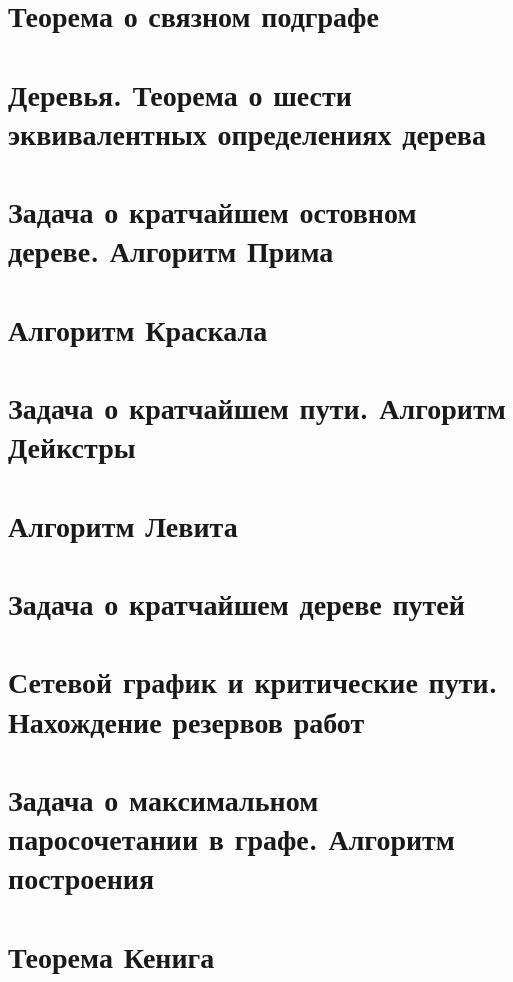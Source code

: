 \documentclass[12pt, fleqn]{article}
\begin{document}
  \section{Теорема о связном подграфе}

  
  \newpage

  \section{Деревья. Теорема о шести эквивалентных определениях дерева}
  
  \newpage

  \section{Задача о кратчайшем остовном дереве. Алгоритм Прима}
  \newpage

  \section{Алгоритм Краскала}
  \newpage

  \section{Задача о кратчайшем пути. Алгоритм Дейкстры}
  \newpage

  \section{Алгоритм Левита}
  
  \newpage

  \section{Задача о кратчайшем дереве путей}
  
  \newpage

  \section{Сетевой график и критические пути. Нахождение резервов работ}
  \newpage

  \section{Задача о максимальном паросочетании в графе. Алгоритм построения}
  
  \newpage

  \section{Теорема Кенига}
  
  \newpage
\end{document}
